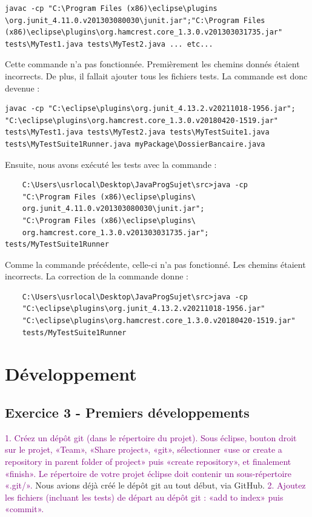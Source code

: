 \documentclass{article}
\begin{document}
	
\begin{lstlisting}
javac -cp "C:\Program Files (x86)\eclipse\plugins
\org.junit_4.11.0.v201303080030\junit.jar";"C:\Program Files 
(x86)\eclipse\plugins\org.hamcrest.core_1.3.0.v201303031735.jar" 
tests\MyTest1.java tests\MyTest2.java ... etc...
\end{lstlisting}
Cette commande n'a pas fonctionnée.
Premièrement les chemins donnés étaient incorrects. De plus, il fallait ajouter tous les fichiers tests.
La commande est donc devenue :
\begin{lstlisting}
javac -cp "C:\eclipse\plugins\org.junit_4.13.2.v20211018-1956.jar";
"C:\eclipse\plugins\org.hamcrest.core_1.3.0.v20180420-1519.jar" 
tests\MyTest1.java tests\MyTest2.java tests\MyTestSuite1.java 
tests\MyTestSuite1Runner.java myPackage\DossierBancaire.java
\end{lstlisting}

Ensuite, nous avons exécuté les tests avec la commande :
\begin{lstlisting}
    C:\Users\usrlocal\Desktop\JavaProgSujet\src>java -cp 
    "C:\Program Files (x86)\eclipse\plugins\
    org.junit_4.11.0.v201303080030\junit.jar";
    "C:\Program Files (x86)\eclipse\plugins\
    org.hamcrest.core_1.3.0.v201303031735.jar"; tests/MyTestSuite1Runner
\end{lstlisting}

Comme la commande précédente, celle-ci n'a pas fonctionné. Les chemins étaient incorrects. La correction de la commande donne :

\begin{lstlisting}
    C:\Users\usrlocal\Desktop\JavaProgSujet\src>java -cp 
    "C:\eclipse\plugins\org.junit_4.13.2.v20211018-1956.jar"
    "C:\eclipse\plugins\org.hamcrest.core_1.3.0.v20180420-1519.jar"
    tests/MyTestSuite1Runner
\end{lstlisting}
\newpage
\section{Développement}

\subsection{Exercice 3 - Premiers développements}

\textcolor{Purple}{1. Créez un dépôt git (dans le répertoire du projet). Sous éclipse, bouton droit sur le projet,
«Team», «Share project», «git», sélectionner «use or create a repository in parent folder of project» puis «create repository», et finalement «finish». Le répertoire de votre projet éclipse doit contenir un sous-répertoire «.git/».}
\newline
\bigskip
Nous avions déjà créé le dépôt git au tout début, via GitHub.
\bigskip
\newline
\textcolor{Purple}{2. Ajoutez les fichiers (incluant les tests) de départ au dépôt git : «add to index» puis «commit».}
\end{document}
